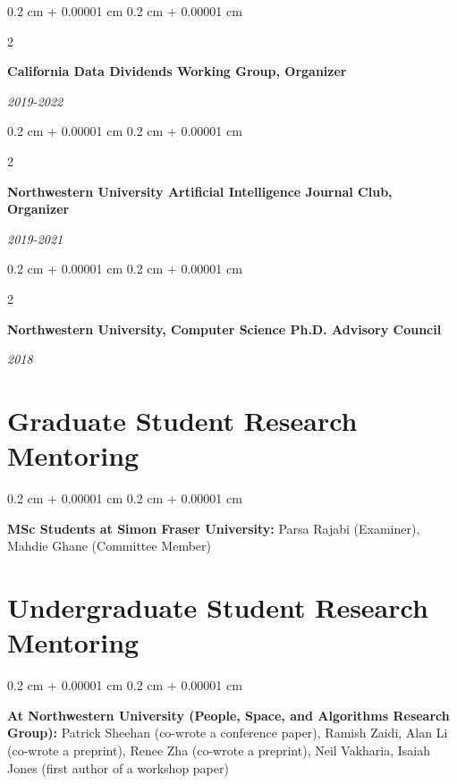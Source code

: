 \documentclass[10pt, letterpaper]{article}
\newenvironment{onecolentry}{
    \begin{adjustwidth}{
        0.2 cm + 0.00001 cm
    }{
        0.2 cm + 0.00001 cm
    }
}{
    \end{adjustwidth}
} %
\newenvironment{twocolentry}[2][]{
    \onecolentry
    \def\secondColumn{#2}
    \setcolumnwidth{\fill, 4.1 cm}
    \begin{paracol}{2}
}{
    \switchcolumn \raggedleft \secondColumn
    \end{paracol}
    \endonecolentry
} %
\begin{document}
        \vspace{0.2 cm}

        \begin{twocolentry}{
            
            
        \textit{2019-2022}}
            \textbf{California Data Dividends Working Group, Organizer}
        \end{twocolentry}



        \vspace{0.2 cm}

        \begin{twocolentry}{
            
            
        \textit{2019-2021}}
            \textbf{Northwestern University Artificial Intelligence Journal Club, Organizer}
        \end{twocolentry}



        \vspace{0.2 cm}

        \begin{twocolentry}{
            
            
        \textit{2018}}
            \textbf{Northwestern University, Computer Science Ph.D. Advisory Council}
        \end{twocolentry}




    
    \section{Graduate Student Research Mentoring}



        
        \begin{onecolentry}
            \textbf{MSc Students at Simon Fraser University:} Parsa Rajabi (Examiner), Mahdie Ghane (Committee Member)
        \end{onecolentry}


    
    \section{Undergraduate Student Research Mentoring}



        
        \begin{onecolentry}
            \textbf{At Northwestern University (People, Space, and Algorithms Research Group):} Patrick Sheehan (co-wrote a conference paper), Ramish Zaidi, Alan Li (co-wrote a preprint), Renee Zha (co-wrote a preprint), Neil Vakharia, Isaiah Jones (first author of a workshop paper)
        \end{onecolentry}
\end{document}
